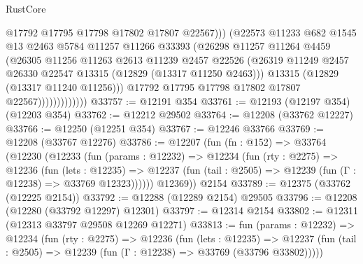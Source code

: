 \begin{lexlean}{RustCore}
\begin{coremodule}
                                @17792
                                @17795
                                @17798
                                @17802
                                @17807
                                @22567)))
                          (@22573
                            @11233
                            @682
                            @1545
                            @13
                            @2463
                            @5784
                            @11257
                            @11266
                            @33393
                            (@26298
                              @11257
                              @11264
                              @4459
                              (@26305
                                @11256
                                @11263
                                @2613
                                @11239
                                @2457
                                @22526
                                (@26319
                                  @11249
                                  @2457
                                  @26330
                                  @22547
                                  @13315
                                  (@12829 (@13317 @11250 @2463)))
                                @13315
                                (@12829 (@13317 @11240 @11256)))
                              @17792
                              @17795
                              @17798
                              @17802
                              @17807
                              @22567)))))))))))))
@33757 := @12191 @354
@33761 := @12193 (@12197 @354) (@12203 @354)
@33762 := @12212 @29502
@33764 := @12208 (@33762 @12227)
@33766 := @12250 (@12251 @354)
@33767 := @12246 @33766
@33769 := @12208 (@33767 @12276)
@33786 := @12207
    (fun (fn : @152) =>
    @33764
      (@12230
        (@12233
          (fun (params : @12232) =>
          @12234
            (fun (rty : @2275) =>
            @12236
              (fun (lets : @12235) =>
              @12237 (fun (tail : @2505) => @12239 (fun (Γ : @12238) => @33769 @12323))))))
        @12369))
    @2154
@33789 := @12375 (@33762 (@12225 @2154))
@33792 := @12288 (@12289 @2154) @29505
@33796 := @12208 (@12280 (@33792 @12297) @12301)
@33797 := @12314 @2154
@33802 := @12311 (@12313 @33797 @29508 @12269 @12271)
@33813 := fun (params : @12232) =>
  @12234
    (fun (rty : @2275) =>
    @12236
      (fun (lets : @12235) =>
      @12237 (fun (tail : @2505) => @12239 (fun (Γ : @12238) => @33769 (@33796 @33802)))))

\end{coremodule}
\end{lexlean}
